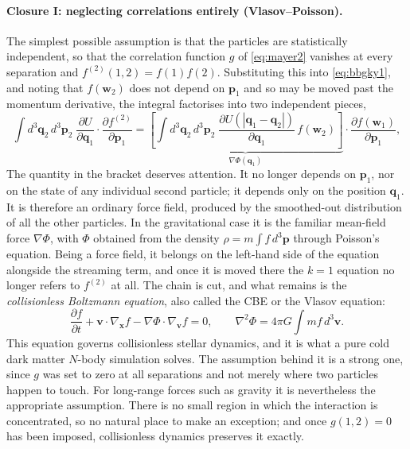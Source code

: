 \documentclass[12pt]{article}
\renewcommand{\vec}[1]{\bm{#1}}
\begin{document}
\paragraph{Closure I: neglecting correlations entirely
(Vlasov--Poisson).}  The simplest possible assumption is that the
particles are statistically independent, so that the correlation
function $g$ of \eqref{eq:mayer2} vanishes at every separation and
$f^{(2)}(1,2) = f(1)f(2)$.  Substituting this into
\eqref{eq:bbgky1}, and noting that $f(\vec w_2)$ does not depend on
$\vec p_1$ and so may be moved past the momentum derivative, the
integral factorises into two independent pieces,
%
\begin{equation}
  \!\int\! d^3\vec q_2\,d^3\vec p_2\;
    \frac{\partial U}{\partial\vec q_1}\!\cdot\!
    \frac{\partial f^{(2)}}{\partial\vec p_1}
  = \underbrace{\left[\int\! d^3\vec q_2\,d^3\vec p_2\;
      \frac{\partial U(|\vec q_1-\vec q_2|)}{\partial\vec q_1}\,
      f(\vec w_2)\right]}_{\textstyle \nabla\Phi(\vec q_1)}
    \!\cdot\!\frac{\partial f(\vec w_1)}{\partial\vec p_1},
  \label{eq:vlasov_factorisation}
\end{equation}
%
The quantity in the bracket deserves attention.  It no longer depends
on $\vec p_1$, nor on the state of any individual second particle; it
depends only on the position $\vec q_1$.  It is therefore an ordinary
force field, produced by the smoothed-out distribution of all the other
particles.  In the gravitational case it is the familiar mean-field
force $\nabla\Phi$, with $\Phi$ obtained from the density
$\rho = m\!\int f\,d^3\vec p$ through Poisson's equation.  Being a
force field, it belongs on the left-hand side of the equation alongside
the streaming term, and once it is moved there the $k=1$ equation no
longer refers to $f^{(2)}$ at all.  The chain is cut, and what remains
is the \emph{collisionless Boltzmann equation}, also called the CBE or
the Vlasov equation:
%
\begin{equation}
  \frac{\partial f}{\partial t}
    + \vec v\cdot\nabla_{\!\vec x} f
    - \nabla\Phi\cdot\nabla_{\!\vec v} f = 0,
  \qquad \nabla^2\Phi = 4\pi G\!\int m f\,d^3\vec v.
  \label{eq:cbe}
\end{equation}
%
This equation governs collisionless stellar dynamics, and it is what a
pure cold dark matter $N$-body simulation solves.  The assumption
behind it is a strong one, since $g$ was set to zero at all separations
and not merely where two particles happen to touch.  For long-range
forces such as gravity it is nevertheless the appropriate assumption.
There is no small region in which the interaction is concentrated, so
no natural place to make an exception; and once $g(1,2)=0$ has been
imposed, collisionless dynamics preserves it exactly.
\end{document}
